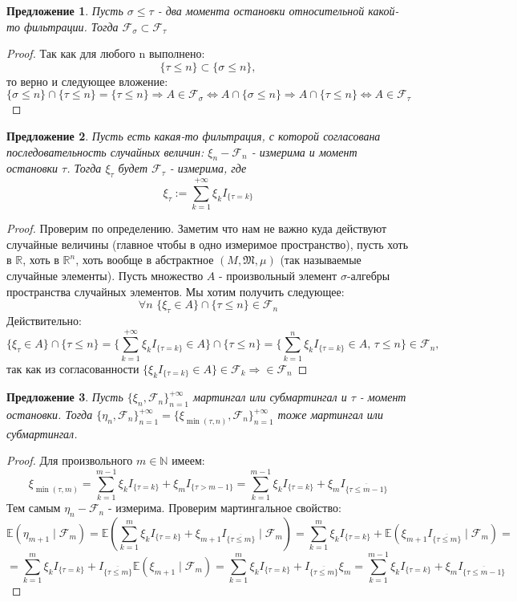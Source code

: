 \documentclass[12pt,a4paper]{article} %
\newtheorem{proposition}{Предложение}
\newcommand{\R}{\mathbb{R}}
\newcommand{\E}{\mathbb{E}}
\newcommand{\F}{\mathcal{F}}
\newcommand{\M}{\mathfrak{M}}
\begin{document}
	\begin{proposition}\label{упр7}
		Пусть $\sigma\leq\tau$ - два момента остановки относительной какой-то фильтрации. Тогда $\F_{\sigma}\subset\F_{\tau}$
	\end{proposition}
	\begin{proof}
		Так как для любого n выполнено:
		$$\{\tau\leq n\}\subset\{\sigma\leq n\},$$
		то верно и следующее вложение:
		$$\{\sigma\leq n\}\cap\{\tau\leq n\}=\{\tau\leq n\}\Longrightarrow A\in\F_{\sigma}\Leftrightarrow A\cap\{\sigma\leq n\}\Rightarrow A\cap\{\tau\leq n\}\Leftrightarrow A\in\F_{\tau}$$
	\end{proof}
	\begin{proposition}
		Пусть есть какая-то фильтрация, с которой согласована последовательность случайных величин: $\xi_n-\F_n$ - измерима и момент остановки $\tau$. Тогда $\xi_{\tau}$ будет $\F_{\tau}$ - измерима, где
		$$\xi_{\tau}:=\sum_{k=1}^{+\infty}\xi_kI_{\{\tau=k\}}$$
	\end{proposition}
	\begin{proof}
		Проверим по определению. Заметим что нам не важно куда действуют случайные величины (главное чтобы в одно измеримое пространство), пусть хоть в $\R$, хоть в $\R^n$, хоть вообще в абстрактное $(M,\M,\mu)$ (так называемые случайные элементы). Пусть множество $A$ - произвольный элемент $\sigma$-алгебры пространства случайных элементов. Мы хотим получить следующее:
		$$\forall n\,\,\{\xi_{\tau}\in A\}\cap\{\tau\leq n\}\in\F_n$$
		Действительно:
		$$\{\xi_{\tau}\in A\}\cap\{\tau\leq n\}=\{\sum_{k=1}^{+\infty}\xi_kI_{\{\tau=k\}}\in A\}\cap\{\tau\leq n\}=\{\sum_{k=1}^n\xi_kI_{\{\tau=k\}}\in A,\,\tau\leq n\}\in\F_n,$$
		так как из согласованности $\{\xi_kI_{\{\tau=k\}}\in A\}\in\F_k\Rightarrow\in\F_n$
	\end{proof}
	\begin{proposition}
		Пусть $\{\xi_n,\F_n\}_{n=1}^{+\infty}$ мартингал или субмартингал и $\tau$ - момент остановки. Тогда $\{\eta_n,\F_n\}_{n=1}^{+\infty}=\{\xi_{\min(\tau,n)},\F_n\}_{n=1}^{+\infty}$ тоже мартингал или субмартингал.
	\end{proposition}
	\begin{proof}
		Для произвольного $m\in\mathbb{N}$ имеем:
		$$\xi_{\min(\tau,m)}=\sum_{k=1}^{m-1}\xi_kI_{\{\tau=k\}}+\xi_mI_{\{\tau>m-1\}}=\sum_{k=1}^{m-1}\xi_kI_{\{\tau=k\}}+\xi_mI_{\overline{\{\tau\leq m-1\}}}$$
		Тем самым $\eta_n - \F_n$ - измерима. Проверим мартингальное свойство:
		$$\E(\eta_{m+1}\mid\F_m)=\E(\sum_{k=1}^m\xi_kI_{\{\tau=k\}}+\xi_{m+1}I_{\overline{\{\tau\leq m\}}}\mid\F_m)=\sum_{k=1}^m\xi_kI_{\{\tau=k\}}+\E(\xi_{m+1}I_{\overline{\{\tau\leq m\}}}\mid\F_m)=$$
		$$=\sum_{k=1}^m\xi_kI_{\{\tau=k\}}+I_{\overline{\{\tau\leq m\}}}\E(\xi_{m+1}\mid\F_m)=\sum_{k=1}^m\xi_kI_{\{\tau=k\}}+I_{\overline{\{\tau\leq m\}}}\xi_m=\sum_{k=1}^{m-1}\xi_kI_{\{\tau=k\}}+\xi_mI_{\overline{\{\tau\leq m-1\}}}$$
	\end{proof}
\end{document}
